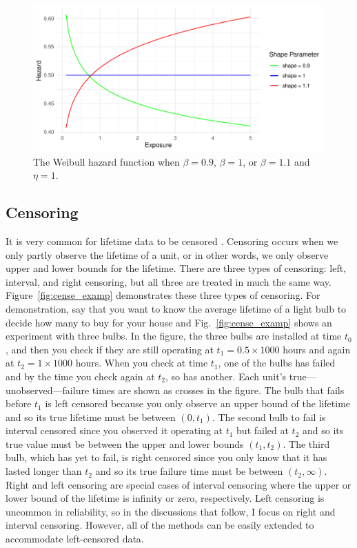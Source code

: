 \begin{figure}[h]
    \centering
    \includegraphics[width=1\textwidth]{./figures/ch-2/hazard_func_demo.pdf}
    \caption{The Weibull hazard function when $\beta = 0.9$, $\beta = 1$, or $\beta = 1.1$ and $\eta = 1$.}
    \label{fig:hazard_function_demo}
\end{figure}

\subsection{Censoring} \label{subsec:censoring-treatments}

It is very common for lifetime data to be censored \citep{tian2024}. Censoring occurs when we only partly observe the lifetime of a unit, or in other words, we only observe upper and lower bounds for the lifetime. There are three types of censoring: left, interval, and right censoring, but all three are treated in much the same way. Figure~\ref{fig:cense_examp} demonstrates these three types of censoring. For demonstration, say that you want to know the average lifetime of a light bulb to decide how many to buy for your house and Fig.~\ref{fig:cense_examp} shows an experiment with three bulbs. In the figure, the three bulbs are installed at time $t_0$, and then you check if they are still operating at $t_1 = 0.5 \times 1000$ hours and again at $t_2 = 1 \times 1000$ hours. When you check at time $t_1$, one of the bulbs has failed and by the time you check again at $t_2$, so has another. Each unit's true---unobserved---failure times are shown as crosses in the figure. The bulb that fails before $t_1$ is left censored because you only observe an upper bound of the lifetime and so its true lifetime must be between $(0, t_1)$. The second bulb to fail is interval censored since you observed it operating at $t_1$ but failed at $t_2$ and so its true value must be between the upper and lower bounds $(t_1, t_2)$. The third bulb, which has yet to fail, is right censored since you only know that it has lasted longer than $t_2$ and so its true failure time must be between $(t_2, \infty)$. Right and left censoring are special cases of interval censoring where the upper or lower bound of the lifetime is infinity or zero, respectively. Left censoring is uncommon in reliability, so in the discussions that follow, I focus on right and interval censoring. However, all of the methods can be easily extended to accommodate left-censored data.

